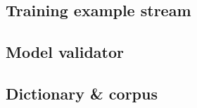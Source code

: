 \subsection{Training example stream}
\label{sec:trainexamplestream}

\subsection{Model validator}
\label{sec:trainexamplestream}

\subsection{Dictionary \& corpus}
\label{sec:dict}

